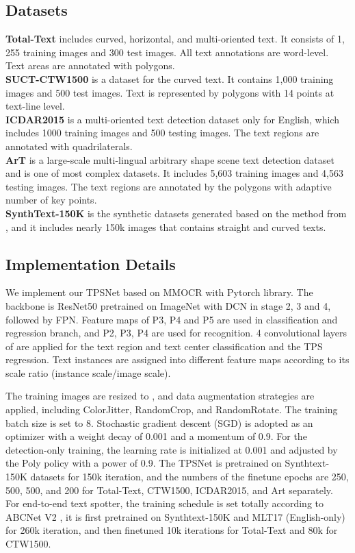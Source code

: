 \documentclass[sigconf]{acmart}
\begin{document}
	\subsection{Datasets}
	\noindent \textbf{Total-Text}  \cite{ch2017total} includes curved, horizontal, and multi-oriented text. It consists of 1, 255 training images and 300 test images. All text annotations are word-level. Text areas are annotated with polygons.\\
	\textbf{SUCT-CTW1500} \cite{yuan2019ctw} is a dataset for the curved text. It contains 1,000 training images and 500 test images. Text is represented by polygons with 14 points at text-line level.\\
	\textbf{ICDAR2015}  \cite{karatzas2015icdar2015} is a multi-oriented text detection dataset only for English, which includes 1000 training images and 500 testing images. The text regions are annotated with quadrilaterals.\\
	\textbf{ArT} \cite{chng2019icdar2019} is a large-scale multi-lingual arbitrary shape
	scene text detection dataset and is one of most complex datasets. It includes 5,603 training images and 4,563 testing images. The text regions are annotated by the polygons with adaptive number of key points.\\
	\textbf{SynthText-150K}  \cite{Liu2020ABCNet} is the synthetic datasets generated based on the method from  \cite{gupta2016synthetic}, and it includes nearly 150k images that contains straight and curved texts. 
	
	\subsection{Implementation Details}
	We implement our TPSNet based on MMOCR   \cite{kuang2021mmocr} with Pytorch   \cite{paszke2019pytorch} library. The backbone is ResNet50 pretrained on ImageNet with DCN in stage 2, 3 and 4, followed by FPN. Feature maps of P3, P4 and P5 are used in classification and regression branch, and P2, P3, P4 are used for recognition. 4 convolutional layers of  are applied for the text region and text center classification and the TPS regression.
	Text instances are assigned into different feature maps according to its scale ratio (instance scale/image scale).


	The training images are resized to , and data augmentation strategies are applied, including ColorJitter, RandomCrop, and RandomRotate. The training batch size is set to 8. Stochastic gradient descent (SGD) is adopted as an optimizer with a weight decay of 0.001 and a momentum of 0.9. For the detection-only training, the learning rate is initialized at 0.001 and adjusted by the Poly policy with a power of 0.9. The TPSNet is pretrained on Synthtext-150K datasets for 150k iteration, and the numbers of the finetune epochs are 250, 500, 500, and 200 for Total-Text, CTW1500, ICDAR2015, and Art separately. For end-to-end text spotter, the training schedule is set totally according to ABCNet V2 \cite{abcnetv2}, it is first pretrained on Synthtext-150K and MLT17 (English-only) for 260k iteration, and then finetuned 10k iterations for Total-Text and 80k for CTW1500.
	
\end{document}
